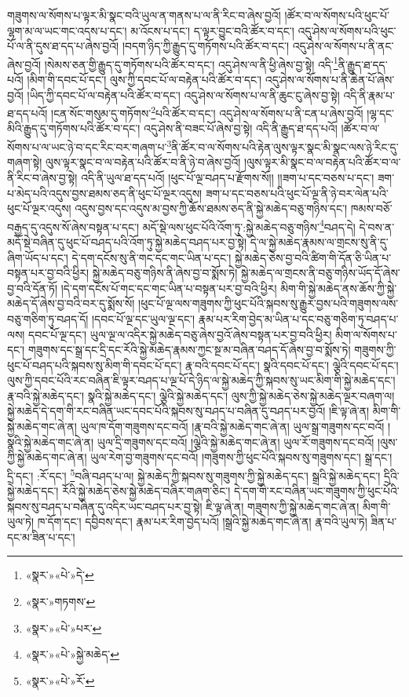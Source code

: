 གཟུགས་ལ་སོགས་པ་ལྟར་མི་སྣང་བའི་ཡུལ་ན་གནས་པ་ལ་ནི་རིང་བ་ཞེས་བྱའོ། །ཚོར་བ་ལ་སོགས་པའི་ཕུང་པོ་ལྷག་མ་ལ་ཡང་གང་འདས་པ་དང་། མ་འོངས་པ་དང་། ད་ལྟར་བྱུང་བའི་ཚོར་བ་དང་། འདུ་ཤེས་ལ་སོགས་པའི་ཕུང་པོ་ལ་ནི་དུས་ཐ་དད་པ་ཞེས་བྱའོ། །བདག་ཉིད་ཀྱི་རྒྱུད་དུ་གཏོགས་པའི་ཚོར་བ་དང་། འདུ་ཤེས་ལ་སོགས་པ་ནི་ནང་ཞེས་བྱའོ། །སེམས་ཅན་གྱི་རྒྱུད་དུ་གཏོགས་པའི་ཚོར་བ་དང་། འདུ་ཤེས་ལ་ནི་ཕྱི་ཞེས་བྱ་སྟེ། འདི་\footnote{«སྣར་»«པེ་»དེ་}ནི་རྒྱུད་ཐ་དད་པའོ། །མིག་གི་དབང་པོ་དང་། ལུས་ཀྱི་དབང་པོ་ལ་བརྟེན་པའི་ཚོར་བ་དང་། འདུ་ཤེས་ལ་སོགས་པ་ནི་ཆེན་པོ་ཞེས་བྱའོ། །ཡིད་ཀྱི་དབང་པོ་ལ་བརྟེན་པའི་ཚོར་བ་དང་། འདུ་ཤེས་ལ་སོགས་པ་ལ་ནི་ཆུང་ངུ་ཞེས་བྱ་སྟེ། འདི་ནི་རྣམ་པ་ཐ་དད་པའོ། །ངན་སོང་གསུམ་དུ་གཏོགས་\footnote{«སྣར་»གཏགས་}པའི་ཚོར་བ་དང་། འདུ་ཤེས་ལ་སོགས་པ་ནི་ངན་པ་ཞེས་བྱའོ། །ལྷ་དང་མིའི་རྒྱུད་དུ་གཏོགས་པའི་ཚོར་བ་དང་། འདུ་ཤེས་ནི་བཟང་པོ་ཞེས་བྱ་སྟེ། འདི་ནི་རྒྱུད་ཐ་དད་པའོ། །ཚོར་བ་ལ་སོགས་པ་ལ་ཡང་ཉེ་བ་དང་རིང་བར་གཞག་པ་\footnote{«སྣར་»«པེ་»པར་}ནི་ཚོར་བ་ལ་སོགས་པའི་རྟེན་ལུས་ལྟར་སྣང་མི་སྣང་ལས་ཉེ་རིང་དུ་གཞག་སྟེ། ལུས་ལྟར་སྣང་བ་ལ་བརྟེན་པའི་ཚོར་བ་ནི་ཉེ་བ་ཞེས་བྱའོ། །ལུས་ལྟར་མི་སྣང་བ་ལ་བརྟེན་པའི་ཚོར་བ་ལ་ནི་རིང་བ་ཞེས་བྱ་སྟེ། འདི་ནི་ཡུལ་ཐ་དད་པའོ། །ཕུང་པོ་ལྔ་བཤད་པ་རྫོགས་སོ།། །།ཟག་པ་དང་བཅས་པ་དང་། ཟག་པ་མེད་པའི་འདུས་བྱས་ཐམས་ཅད་ནི་ཕུང་པོ་ལྔར་འདུས། ཟག་པ་དང་བཅས་པའི་ཕུང་པོ་ལྔ་ནི་ཉེ་བར་ལེན་པའི་ཕུང་པོ་ལྔར་འདུས། འདུས་བྱས་དང་འདུས་མ་བྱས་ཀྱི་ཆོས་ཐམས་ཅད་ནི་སྐྱེ་མཆེད་བཅུ་གཉིས་དང་། ཁམས་བཅོ་བརྒྱད་དུ་འདུས་སོ་ཞེས་བསྟན་པ་དང་། མདོ་སྡེ་ལས་ཕུང་པོའི་འོག་ཏུ་:སྐྱེ་མཆེད་བཅུ་གཉིས་\footnote{«སྣར་»«པེ་»སྐྱེ་མཆེད་}བཤད་དེ། དེ་བས་ན་མདོ་སྡེ་བཞིན་དུ་ཕུང་པོ་བཤད་པའི་འོག་ཏུ་སྐྱེ་མཆེད་བཤད་པར་བྱ་སྟེ། དེ་ལ་སྐྱེ་མཆེད་རྣམས་ལ་གྲངས་སུ་ནི་དུ་ཞིག་ཡོད་པ་དང་། དེ་དག་དངོས་སུ་ནི་གང་དང་གང་ཡིན་པ་དང་། སྐྱེ་མཆེད་ཅེས་བྱ་བའི་ཚིག་གི་དོན་ཅི་ཡིན་པ་བསྟན་པར་བྱ་བའི་ཕྱིར། སྐྱེ་མཆེད་བཅུ་གཉིས་ནི་ཞེས་བྱ་བ་སྨོས་ཏེ། སྐྱེ་མཆེད་ལ་གྲངས་ནི་བཅུ་གཉིས་ཡོད་དོ་ཞེས་བྱ་བའི་དོན་ཏོ། །དེ་དག་དངོས་པོ་གང་དང་གང་ཡིན་པ་བསྟན་པར་བྱ་བའི་ཕྱིར། མིག་གི་སྐྱེ་མཆེད་ནས་ཆོས་ཀྱི་སྐྱེ་མཆེད་དོ་ཞེས་བྱ་བའི་བར་དུ་སྨོས་སོ། །ཕུང་པོ་ལྔ་ལས་གཟུགས་ཀྱི་ཕུང་པོའི་སྐབས་སུ་རྒྱུར་བྱས་པའི་གཟུགས་ལས་བཅུ་གཅིག་ཏུ་བཤད་དོ། །དབང་པོ་ལྔ་དང་ཡུལ་ལྔ་དང་། རྣམ་པར་རིག་བྱེད་མ་ཡིན་པ་དང་བཅུ་གཅིག་ཏུ་བཤད་པ་ལས། དབང་པོ་ལྔ་དང་། ཡུལ་ལྔ་ལ་འདིར་སྐྱེ་མཆེད་བཅུ་ཞེས་བྱའོ་ཞེས་བསྟན་པར་བྱ་བའི་ཕྱིར། མིག་ལ་སོགས་པ་དང་། གཟུགས་དང་སྒྲ་དང་དྲི་དང་རོའི་སྐྱེ་མཆེད་རྣམས་ཀྱང་སྔ་མ་བཞིན་བཤད་དོ་ཞེས་བྱ་བ་སྨོས་ཏེ། གཟུགས་ཀྱི་ཕུང་པོ་བཤད་པའི་སྐབས་སུ་མིག་གི་དབང་པོ་དང་། རྣ་བའི་དབང་པོ་དང་། སྣའི་དབང་པོ་དང་། ལྕེའི་དབང་པོ་དང་། ལུས་ཀྱི་དབང་པོའི་རང་བཞིན་ཇི་ལྟར་བཤད་པ་ལྔ་པོ་དེ་ཉིད་ལ་སྐྱེ་མཆེད་ཀྱི་སྐབས་སུ་ཡང་མིག་གི་སྐྱེ་མཆེད་དང་། རྣ་བའི་སྐྱེ་མཆེད་དང་། སྣའི་སྐྱེ་མཆེད་དང་། ལྕེའི་སྐྱེ་མཆེད་དང་། ལུས་ཀྱི་སྐྱེ་མཆེད་ཅེས་སྐྱེ་མཆེད་ལྔར་བཞག་ལ། སྐྱེ་མཆེད་དེ་དག་གི་རང་བཞིན་ཡང་དབང་པོའི་སྐབས་སུ་བཤད་པ་བཞིན་དུ་བཤད་པར་བྱའོ། །ཇི་ལྟ་ཞེ་ན། མིག་གི་སྐྱེ་མཆེད་གང་ཞེ་ན། ཡུལ་ཁ་དོག་གཟུགས་དང་བའོ། །རྣ་བའི་སྐྱེ་མཆེད་གང་ཞེ་ན། ཡུལ་སྒྲ་གཟུགས་དང་བའོ། །སྣའི་སྐྱེ་མཆེད་གང་ཞེ་ན། ཡུལ་དྲི་གཟུགས་དང་བའོ། །ལྕེའི་སྐྱེ་མཆེད་གང་ཞེ་ན། ཡུལ་རོ་གཟུགས་དང་བའོ། །ལུས་ཀྱི་སྐྱེ་མཆེད་གང་ཞེ་ན། ཡུལ་རེག་བྱ་གཟུགས་དང་བའོ། །གཟུགས་ཀྱི་ཕུང་པོའི་སྐབས་སུ་གཟུགས་དང་། སྒྲ་དང་། དྲི་དང་། :རོ་དང་། \footnote{«སྣར་»«པེ་»རོ་}བཞི་བཤད་པ་ལ། སྐྱེ་མཆེད་ཀྱི་སྐབས་སུ་གཟུགས་ཀྱི་སྐྱེ་མཆེད་དང་། སྒྲའི་སྐྱེ་མཆེད་དང་། དྲིའི་སྐྱེ་མཆེད་དང་། རོའི་སྐྱེ་མཆེད་ཅེས་སྐྱེ་མཆེད་བཞིར་གཞག་ཅིང་། དེ་དག་གི་རང་བཞིན་ཡང་གཟུགས་ཀྱི་ཕུང་པོའི་སྐབས་སུ་བཤད་པ་བཞིན་དུ་འདིར་ཡང་བཤད་པར་བྱ་སྟེ། ཇི་ལྟ་ཞེ་ན། གཟུགས་ཀྱི་སྐྱེ་མཆེད་གང་ཞེ་ན། མིག་གི་ཡུལ་ཏེ། ཁ་དོག་དང་། དབྱིབས་དང་། རྣམ་པར་རིག་བྱེད་པའོ། །སྒྲའི་སྐྱེ་མཆེད་གང་ཞེ་ན། རྣ་བའི་ཡུལ་ཏེ། ཟིན་པ་དང་མ་ཟིན་པ་དང་། 